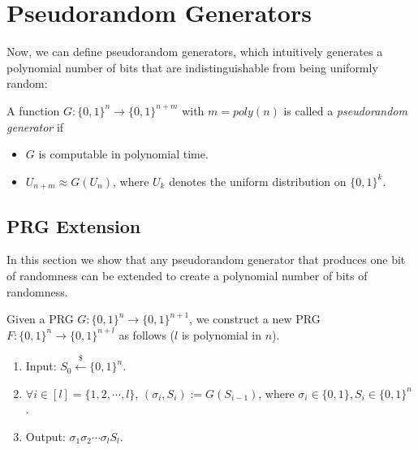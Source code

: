 \documentclass[12pt]{tufte-book}
\providecommand{\DIFadd}[1]{{\protect\color{blue}\uwave{#1}}} %
\providecommand{\DIFaddbegin}{} %
\providecommand{\DIFaddend}{} %
\begin{document}
%
%
%
%
%
%
%
\fi

\section{Pseudorandom Generators}
Now, we can define pseudorandom generators, which intuitively generates a polynomial number of bits that are \DIFaddbegin \DIFadd{computationally }\DIFaddend indistinguishable from being uniformly random:
\begin{definition}
A function $G:\{0,1\}^n\rightarrow \{0,1\}^{n+m}$ with $m = poly(n)$ is called a \emph{pseudorandom generator} if
\begin{itemize}
\item $G$ is computable in polynomial time.
\item $U_{n+m}\approx G(U_n)$, where $U_k$ denotes the uniform distribution on $\{0,1\}^k$.
\end{itemize}
\end{definition}


\subsection{PRG Extension}
In this section we show that any pseudorandom generator that produces one bit of randomness can be extended to create a polynomial number of bits of randomness.

\begin{construction}
Given a PRG $G: \{0, 1\}^n \rightarrow \{0, 1\} ^ {n+1}$,
we construct a new PRG $F: \{0, 1\}^n \rightarrow \{0, 1\} ^{n+l}$ as follows ($l$ is polynomial in $n$).
\begin{enumerate}[label=(\alph*)]
    \item Input: $S_0 \xleftarrow{\$} \{0, 1\}^n$.
    \item $\forall i \in [l] = \{1, 2, \cdots, l\}$, $(\sigma_i, S_i) := G(S_{i-1})$, where $\sigma_i \in \{0, 1\}, S_i \in \{0, 1\}^n$ .
    \item Output: $\sigma_1 \sigma_2 \cdots \sigma_l S_l$.
\end{enumerate}
\end{construction}
\end{document}
